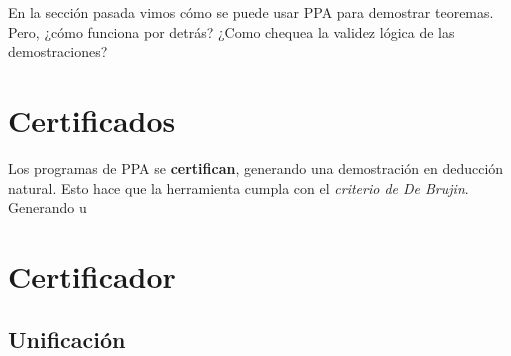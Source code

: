 En la sección pasada vimos cómo se puede usar PPA para demostrar teoremas. Pero,
¿cómo funciona por detrás? ¿Como chequea la validez lógica de las
demostraciones?

\section{Certificados}

Los programas de PPA se \textbf{certifican}, generando una demostración en
deducción natural. Esto hace que la herramienta cumpla con el \textit{criterio
de De Brujin}. Generando u

\section{Certificador}




\subsection{Unificación}
\label{ppa:sec:unification}